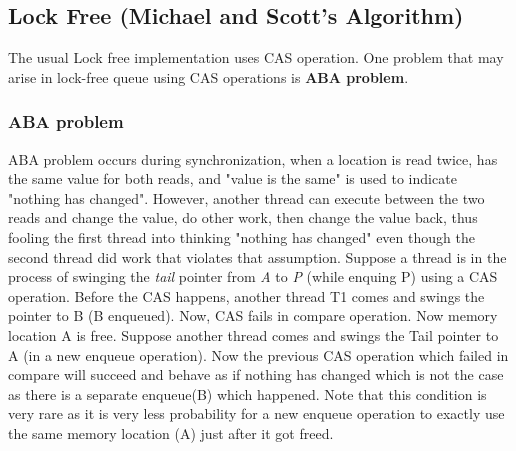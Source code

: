 \documentclass[twoside]{article}
\begin{document}
\subsection{Lock Free (Michael and Scott's Algorithm)}
The usual Lock free implementation uses CAS operation. One problem that may arise in lock-free queue using CAS operations is \textbf{ABA problem}.

\subsubsection{ABA problem}
 ABA problem occurs during synchronization, when a location is read twice, has the same value for both reads, and "value is the same" is used to indicate "nothing has changed". However, another thread can execute between the two reads and change the value, do other work, then change the value back, thus fooling the first thread into thinking "nothing has changed" even though the second thread did work that violates that assumption. Suppose a thread is in the process of swinging the \textit{tail} pointer from \textit{A} to \textit{P} (while enquing P) using a CAS operation. Before the CAS happens, another thread T1 comes and swings the pointer to B (B enqueued). Now, CAS fails in compare operation. Now memory location A is free. Suppose another thread comes and swings the Tail pointer to A (in a new enqueue operation). Now the previous CAS operation which failed in compare will succeed and behave as if nothing has changed which is not the case as there is a separate enqueue(B) which happened. Note that this condition is very rare as it is very less probability for a new enqueue operation to exactly use the same memory location (A) just after it got freed.
\end{document}
